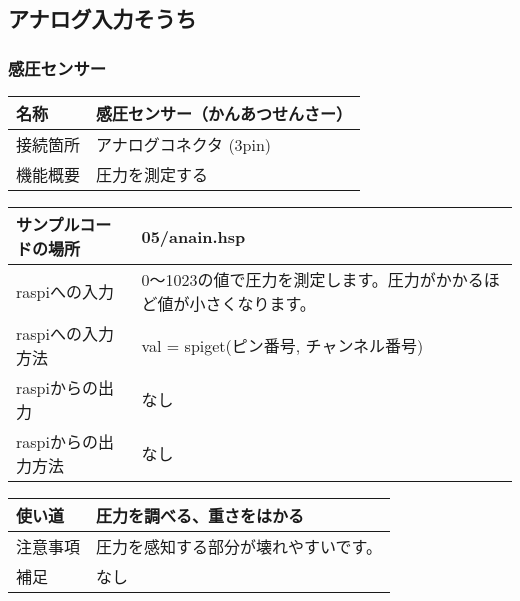 \subsection{アナログ入力そうち}\label{analog_in}
\subsubsection{感圧センサー}\label{touch}
\begin{table}[H]
  \begin{widerrows}
    \begin{tabular}{|p{\colF}|p{\colG}|}	\hline
    名称 & 感圧センサー（かんあつせんさー）\\ \hline
    接続箇所 & アナログコネクタ (3pin)\\ \hline
    機能概要 & 圧力を測定する\\ \hline
    \end{tabular}
  \end{widerrows} 
\end{table}

\begin{table}[H]
  \begin{widerrows}
    \begin{tabular}{|p{\colF}|p{\colG}|}	\hline
    サンプルコードの場所 & 05/anain.hsp\\ \hline
    raspiへの入力 & 0～1023の値で圧力を測定します。圧力がかかるほど値が小さくなります。\\ \hline
    raspiへの入力方法 & val = spiget(ピン番号, チャンネル番号)\\ \hline
    raspiからの出力 & なし\\ \hline
    raspiからの出力方法 & なし\\ \hline
    \end{tabular}
  \end{widerrows} 
\end{table}

\begin{table}[H]
  \begin{widerrows}
    \begin{tabular}{|p{\colF}|p{\colG}|} \hline
    使い道 & 圧力を調べる、重さをはかる\\ \hline
    注意事項 & 圧力を感知する部分が壊れやすいです。\\ \hline
    補足 & なし\\ \hline
    \end{tabular}
  \end{widerrows} 
\end{table}


